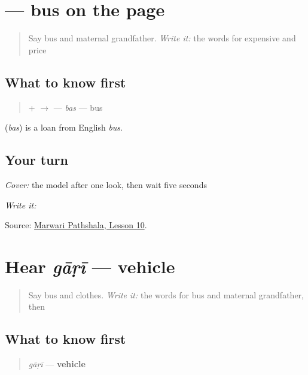 \section[\texorpdfstring{\mw{बस} (bas)}{बस (bas)}]{ — bus on the page}

\label{lesson:MW-C16-bas}



\begin{quote}
Say bus and maternal grandfather. \emph{Write it:} the words for expensive and price
\end{quote}

\subsection*{What to know first}
\begin{quote}
\textbf{} + \textbf{} $\to$ \textbf{} — \emph{bas} — bus
\end{quote}

\begin{cousinweb}
\textbf{} (\emph{bas}) is a loan from English \emph{bus}.
\end{cousinweb}

\subsection*{Your turn}
\emph{Cover:} the model after one look, then wait five seconds

\emph{Write it:} \textbf{}

\begin{tcolorbox}[breakable,colback=teal!4,colframe=teal!35!black,title={Before you move on}]
Source: \href{https://www.marwaripathshala.com/marwari-lesson-10-english}{Marwari Pathshala, Lesson 10}.
\end{tcolorbox}
\section[gāṛī]{Hear \emph{gāṛī} — vehicle}

\label{lesson:MW-C16-hear-gaadi}



\begin{quote}
Say bus and clothes. \emph{Write it:} the words for bus and maternal grandfather, then \textbf{}
\end{quote}

\subsection*{What to know first}
\begin{quote}
\emph{gāṛī} — \textbf{vehicle}
\end{quote}

